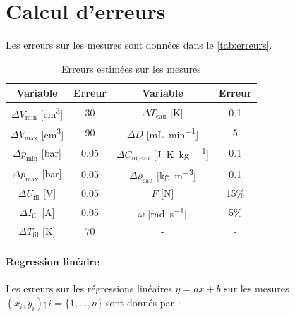 \section{Calcul d'erreurs}
\label{sec:erreurs}

Les erreurs sur les mesures sont données dans le \autoref{tab:erreurs}.

\begin{table}[h]
    \centering
    \begin{tabulary}{\textwidth}{C C|C C}
        \toprule
        Variable & Erreur & Variable & Erreur \\
        \midrule
        \(\Delta V_\textrm{min}\) [\si{\centi\meter\cubed}] & 30 & \(\Delta T_\textrm{eau}\) [\si{\kelvin}] & 0.1 \\
        \(\Delta V_\textrm{max}\) [\si{\centi\meter\cubed}] & 90 & \(\Delta D\) [\si{\milli\liter \per \minute}] & 5 \\
        \(\Delta p_\textrm{min}\) [\si{\bar}] & 0.05 & \(\Delta C_\textrm{m,eau}\) [\si{\joule\per\kelvin\per\kilo\gram}] & 0.1 \\
        \(\Delta p_\textrm{max}\) [\si{\bar}] & 0.05 & \(\Delta \rho_\textrm{eau}\) [\si{\kilo\gram\per\meter\cubed}] & 0.1 \\
        \(\Delta U_\textrm{fil}\) [\si{\volt}] & 0.05 & \(F\) [\si{\newton}] & 15\% \\
        \(\Delta I_\textrm{fil}\) [\si{\ampere}] & 0.05 & \(\omega\) [\si{\radian \per \second}] & 5\% \\
        \(\Delta T_\textrm{fil}\) [\si{\kelvin}] & 70 & - & -\\
        \bottomrule
    \end{tabulary}
    \caption{Erreurs estimées sur les mesures}
    \label{tab:erreurs}
\end{table}

\paragraph*{Regression linéaire}
Les erreurs sur les régressions linéaires \(y = ax + b\) sur les mesures \((x_i, y_i) ; i = \{1, \hdots, n\}\) sont donnés par \cite{erreursmesure}:

